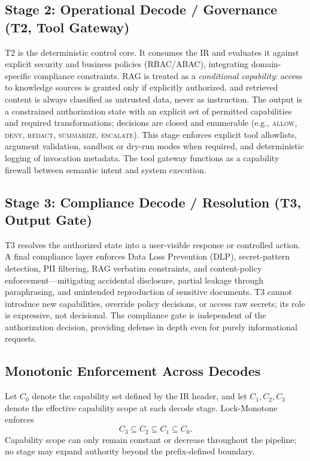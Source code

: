 \documentclass[conference]{IEEEtran}
\begin{document}
\subsection{Stage 2: Operational Decode / Governance (T2, Tool Gateway)}
T2 is the deterministic control core. It consumes the IR and evaluates it
against explicit security and business policies (RBAC/ABAC), integrating
domain-specific compliance constraints. RAG is treated as a
\emph{conditional capability}: access to knowledge sources is granted only
if explicitly authorized, and retrieved content is always classified as
untrusted data, never as instruction. The output is a constrained
authorization state with an explicit set of permitted capabilities and
required transformations; decisions are closed and enumerable (e.g.,
\textsc{allow}, \textsc{deny}, \textsc{redact}, \textsc{summarize},
\textsc{escalate}). This stage enforces explicit tool allowlists, argument
validation, sandbox or dry-run modes when required, and deterministic
logging of invocation metadata. The tool gateway functions as a capability
firewall between semantic intent and system execution.

\subsection{Stage 3: Compliance Decode / Resolution (T3, Output Gate)}
T3 resolves the authorized state into a user-visible response or
controlled action. A final compliance layer enforces Data Loss Prevention
(DLP), secret-pattern detection, PII filtering, RAG verbatim constraints,
and content-policy enforcement---mitigating accidental disclosure, partial
leakage through paraphrasing, and unintended reproduction of sensitive
documents. T3 cannot introduce new capabilities, override policy
decisions, or access raw secrets; its role is expressive, not decisional.
The compliance gate is independent of the authorization decision,
providing defense in depth even for purely informational requests.

\subsection{Monotonic Enforcement Across Decodes}
Let $C_0$ denote the capability set defined by the IR header, and let
$C_1, C_2, C_3$ denote the effective capability scope at each decode
stage. Lock-Monotone enforces
\[
C_3 \subseteq C_2 \subseteq C_1 \subseteq C_0.
\]
Capability scope can only remain constant or decrease throughout the
pipeline; no stage may expand authority beyond the prefix-defined
boundary.
\end{document}
